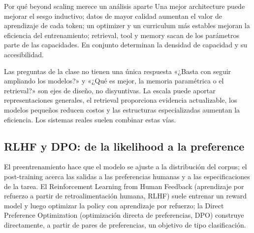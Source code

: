 


\begin{knowledgebox}{Por qué beyond scaling merece un análisis aparte}
Una mejor architecture puede mejorar el sesgo inductivo; datos de mayor calidad aumentan el valor de aprendizaje de cada token; un optimizer y un curriculum más estables mejoran la eficiencia del entrenamiento; retrieval, tool y memory sacan de los parámetros parte de las capacidades. En conjunto determinan la densidad de capacidad y su accesibilidad.
\end{knowledgebox}


\begin{warningbox}{Las preguntas de la clase no tienen una única respuesta}
«¿Basta con seguir ampliando los modelos?» y «¿Qué es mejor, la memoria paramétrica o el retrieval?» son ejes de diseño, no disyuntivas. La escala puede aportar representaciones generales, el retrieval proporciona evidencia actualizable, los modelos pequeños reducen costos y las estructuras especializadas aumentan la eficiencia. Los sistemas reales suelen combinar estas vías.
\end{warningbox}

\subsection{RLHF y DPO: de la likelihood a la preference}

El preentrenamiento hace que el modelo se ajuste a la distribución del corpus; el post-training acerca las salidas a las preferencias humanas y a las especificaciones de la tarea. El Reinforcement Learning from Human Feedback (aprendizaje por refuerzo a partir de retroalimentación humana, RLHF) suele entrenar un reward model y luego optimizar la policy con aprendizaje por refuerzo; la Direct Preference Optimization (optimización directa de preferencias, DPO) construye directamente, a partir de pares de preferencias, un objetivo de tipo clasificación.

